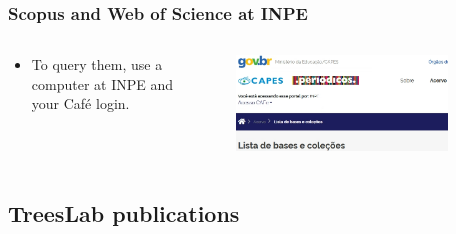 \documentclass[aspectratio=169]{beamer}
\begin{document}
\begin{frame}
	\frametitle{Scopus and Web of Science at INPE}
	\begin{columns}
		\begin{column}{0.5\textwidth}
			\begin{itemize}
				\item To query them, use a computer at INPE and your Café 
                    login.
			\end{itemize}
		\end{column}
		\begin{column}{0.5\textwidth}
			\begin{figure}
				\centering
				\includegraphics[width=0.9\textwidth]{img/inpe_cafe.png}
			\end{figure}
		\end{column}
	\end{columns}
\end{frame}





\subsection{TreesLab publications}
\end{document}
